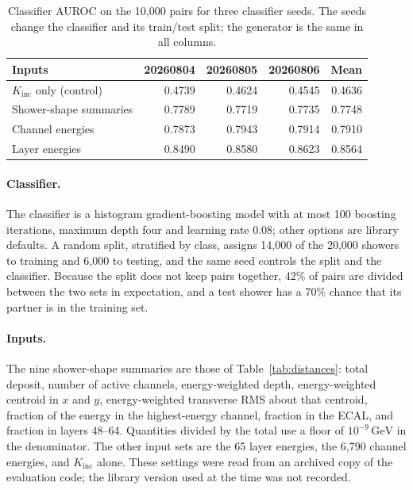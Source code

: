 \documentclass[11pt]{article}
\newcommand{\GeV}{\,\mathrm{GeV}}
\newcommand{\Kinc}{K_{\mathrm{inc}}}
\begin{document}
\begin{table}[H]
\centering
\caption{Classifier AUROC on the 10,000 pairs for three classifier seeds. The seeds change the classifier and its train/test split; the generator is the same in all columns.}
\label{tab:classifier_seeds}
\small
\begin{tabular}{@{}lrrrr@{}}
\toprule
Inputs & 20260804 & 20260805 & 20260806 & Mean \\
\midrule
$\Kinc$ only (control) & 0.4739 & 0.4624 & 0.4545 & 0.4636 \\
Shower-shape summaries & 0.7789 & 0.7719 & 0.7735 & 0.7748 \\
Channel energies & 0.7873 & 0.7943 & 0.7914 & 0.7910 \\
Layer energies & 0.8490 & 0.8580 & 0.8623 & 0.8564 \\
\bottomrule
\end{tabular}
\end{table}

\paragraph{Classifier.} The classifier is a histogram gradient-boosting model with at most 100 boosting iterations, maximum depth four and learning rate 0.08; other options are library defaults. A random split, stratified by class, assigns 14,000 of the 20,000 showers to training and 6,000 to testing, and the same seed controls the split and the classifier. Because the split does not keep pairs together, 42\% of pairs are divided between the two sets in expectation, and a test shower has a 70\% chance that its partner is in the training set.

\paragraph{Inputs.} The nine shower-shape summaries are those of Table~\ref{tab:distances}: total deposit, number of active channels, energy-weighted depth, energy-weighted centroid in $x$ and $y$, energy-weighted transverse RMS about that centroid, fraction of the energy in the highest-energy channel, fraction in the ECAL, and fraction in layers 48--64. Quantities divided by the total use a floor of $10^{-9}\GeV$ in the denominator. The other input sets are the 65 layer energies, the 6,790 channel energies, and $\Kinc$ alone. These settings were read from an archived copy of the evaluation code; the library version used at the time was not recorded.

\printbibliography
\end{document}
